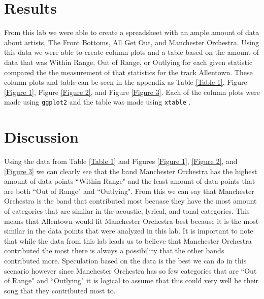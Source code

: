 \documentclass{article}\usepackage[]{graphicx}\usepackage[]{xcolor}
\begin{document}
\begin{multicols}{2}
\section{Results}
From this lab we were able to create a spreadsheet with an
ample amount of data about artists, The Front Bottoms, All
Get Out, and Manchester Orchestra. Using this data we were
able to create column plots and a table based on the amount of data that was Within Range, Out of Range, or Outlying for each given statistic compared the the measurement of that statistics for the track Allentown. These column plots and table can be seen in the appendix as Table \ref{Table 1}, Figure \ref{Figure 1}, Figure \ref{Figure 2}, and Figure \ref{Figure 3}. Each of the column plots were made using \texttt{ggplot2} and the table was made using \texttt{xtable} \citep{ggplot} \citep{xtable}.


\section{Discussion}

Using the data from Table \ref{Table 1} and Figures \ref{Figure 1}, \ref{Figure 2}, and \ref{Figure 3} we can clearly see that the band Manchester Orchestra has the highest amount of data points ``Within Range" and the least amount of data points that are both ``Out of Range" and ``Outlying". From this we can say that Manchester Orchestra is the band that contributed most becuase they have the most amount of categories that are similar in the acoustic, lyrical, and tonal categories. This means that Allentown would fit Manchester Orchestra best because it is the most similar in the data points that were analyzed in this lab. It is important to note that while the data from this lab leads us to believe that Manchester Orchestra contributed the most there is always a possibility that the other bands contributed more. Speculation based on the data is the best we can do in this scenario however since Manchester Orchestra has so few categories that are ``Out of Range" and ``Outlying" it is logical to assume that this could very well be their song that they contributed most to. 

\vspace{2em}


\begin{tiny}

\end{tiny}
\end{multicols}
\end{document}
